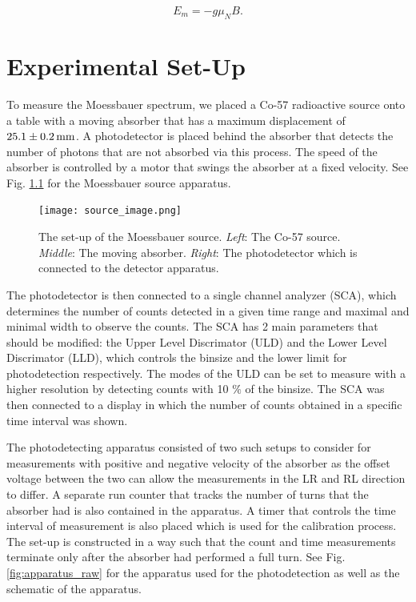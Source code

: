\documentclass[a4paper]{report}
\numberwithin{equation}{section}
\begin{document}
\begin{equation}
		E_{m} = - g \mu _{N} B.
        \label{eq:hyperfine_en}
\end{equation}


\chapter{Experimental Set-Up}

To measure the Moessbauer spectrum, we placed a Co-57 radioactive source onto a table with a moving absorber 
that has a maximum displacement of $\SI[]{25.1 \pm 0.2}[]{\milli\metre}$.  A photodetector is placed 
behind the absorber that detects the number of photons that are not absorbed via this process. The speed of the 
absorber is controlled by a motor that swings the absorber at a fixed velocity. See Fig. \ref{fig:apparatus_source}
for the Moessbauer source apparatus. \par 

\begin{figure}[htb!]
	\centering
	\texttt{[image: source\_image.png]}

	\caption{The set-up of the Moessbauer source. \textit{Left}: The Co-57 source. \textit{Middle}: 
	The moving absorber. \textit{Right}: The photodetector which is connected to the detector apparatus.
	}
	\label{fig:apparatus_source}
\end{figure}

The photodetector is then connected to a single channel analyzer (SCA), which determines the number of counts detected
in a given time range and maximal and minimal width to observe the counts. The SCA has 2 main parameters that should be modified:
the Upper Level Discrimator (ULD) and the Lower Level Discrimator (LLD), which controls the binsize and the lower limit for 
photodetection respectively. The modes of the ULD can be set to measure with a higher resolution by detecting counts with 
10 $\%$ of the binsize. The SCA was then connected to a display in which the number of counts obtained in a specific time 
interval was shown. \par 

The photodetecting apparatus consisted of two such setups to consider for measurements with positive and negative velocity 
of the absorber as the offset voltage between the two can allow the measurements in the LR and RL direction to differ.
A separate run counter that tracks the number of turns that the absorber had is also contained in the apparatus. A timer 
that controls the time interval of measurement is also placed which is used for the calibration process. The set-up is 
constructed in a way such that the count and time measurements terminate only after the absorber had performed a full turn. 
See Fig. \ref{fig:apparatus_raw} for the apparatus used for the photodetection as well as the schematic of the apparatus. \par 
\end{document}
